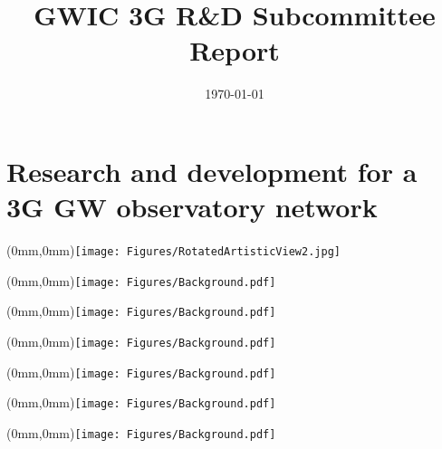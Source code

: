 \documentclass[url,11pt]{book}
\def\biblio{}
\begin{document}

\def\biblio{} %
\togglefalse{standalone}

\title{GWIC 3G R\&D Subcommittee Report }

\date{\today}
\maketitle
\tableofcontents
\newpage
\chapter{Research and development for a 3G GW observatory network}
\label{chap:RaD}



%
%
\clearpage

\FloatBarrier

\begin{textblock*}{297mm}(0mm,0mm)\texttt{[image: Figures/RotatedArtisticView2.jpg]}
\end{textblock*}


\clearpage
\FloatBarrier
\begin{textblock*}{297mm}(0mm,0mm)\texttt{[image: Figures/Background.pdf]}
\end{textblock*}



\clearpage
\FloatBarrier
\begin{textblock*}{297mm}(0mm,0mm)\texttt{[image: Figures/Background.pdf]}
\end{textblock*}

\clearpage
\FloatBarrier
\begin{textblock*}{297mm}(0mm,0mm)\texttt{[image: Figures/Background.pdf]}
\end{textblock*}

\clearpage
\FloatBarrier
\begin{textblock*}{297mm}(0mm,0mm)\texttt{[image: Figures/Background.pdf]}
\end{textblock*}


\clearpage
\FloatBarrier
\begin{textblock*}{297mm}(0mm,0mm)\texttt{[image: Figures/Background.pdf]}
\end{textblock*}

\clearpage
\FloatBarrier
\begin{textblock*}{297mm}(0mm,0mm)\texttt{[image: Figures/Background.pdf]}
\end{textblock*}

\end{document}
